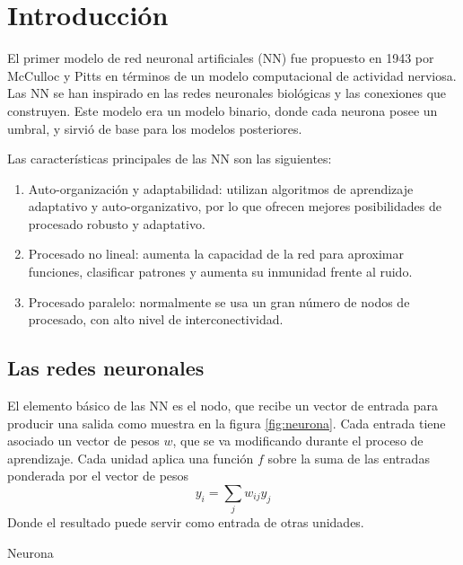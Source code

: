 \section{Introducción}
El primer modelo de red neuronal artificiales (NN) fue propuesto en 1943 por McCulloc y Pitts en términos de un modelo computacional de actividad nerviosa. Las NN se han inspirado en las redes neuronales biológicas y las conexiones que construyen. Este modelo era un modelo binario, donde cada neurona posee un umbral, y sirvió de base para los modelos posteriores.

Las características principales de las NN son las siguientes:
\begin{enumerate}
	\item Auto-organización y adaptabilidad: utilizan algoritmos de aprendizaje adaptativo y auto-organizativo, por lo que ofrecen mejores posibilidades de procesado robusto y adaptativo.

	\item Procesado no lineal: aumenta la capacidad de la red para aproximar funciones, clasificar patrones y aumenta su inmunidad frente al ruido.

	\item Procesado paralelo: normalmente se usa un gran número de nodos de procesado, con alto nivel de interconectividad.
\end{enumerate}

\subsection{Las redes neuronales}
El elemento básico de las NN es el nodo, que recibe un vector de entrada para producir una salida como muestra en la figura \ref{fig:neurona}. Cada entrada tiene asociado un vector de pesos $w$, que se va modificando durante el proceso de aprendizaje. Cada unidad aplica una función $f$ sobre la suma de las entradas ponderada por el vector de pesos
$$ y_{i} = \sum_{j} w_{ij}y_{j} $$
Donde el resultado puede servir como entrada de otras unidades.
\begin{imagen}
	\scalebox{1.5}{}
	\caption{Neurona}
	\label{fig:neurona}
\end{imagen}

